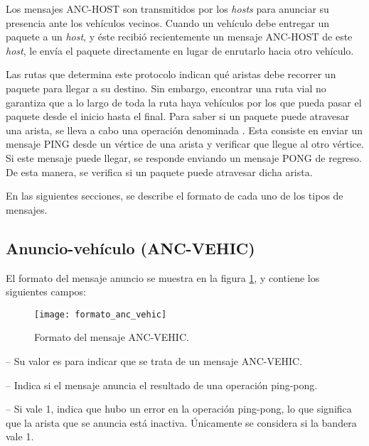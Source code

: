Los mensajes ANC-HOST son transmitidos por los \textit{hosts} para anunciar su
presencia ante los vehículos vecinos. Cuando un vehículo debe entregar un
paquete a un \textit{host}, y éste recibió recientemente un mensaje ANC-HOST de
este \textit{host}, le envía el paquete directamente en lugar de enrutarlo
hacia otro vehículo.

Las rutas que determina este protocolo indican qué aristas debe recorrer un
paquete para llegar a su destino. Sin embargo, encontrar una ruta vial no
garantiza que a lo largo de toda la ruta haya vehículos por los que pueda pasar
el paquete desde el inicio hasta el final. Para saber si un paquete puede
atravesar una arista, se lleva a cabo una operación denominada
. Esta consiste en enviar un mensaje PING desde un vértice
de una arista y verificar que llegue al otro vértice. Si este mensaje puede
llegar, se responde enviando un mensaje PONG de regreso. De esta manera, se
verifica si un paquete puede atravesar dicha arista.

En las siguientes secciones, se describe el formato de cada uno de los tipos de
mensajes.

\subsection{Anuncio-vehículo (ANC-VEHIC)}

\label{subsec:mensaje_anc_vehic}

El formato del mensaje anuncio se muestra en la figura
\ref{fig:formato_anc_vehic}, y contiene los siguientes campos:

\begin{figure}[th!]
\centering
\texttt{[image: formato\_anc\_vehic]}
\decoRule
\caption[Formato del mensaje ANC-VEHIC]{Formato del mensaje ANC-VEHIC.}
\label{fig:formato_anc_vehic}
\end{figure}

 -- Su valor es  para indicar que se trata de un
mensaje ANC-VEHIC.

 -- Indica si el mensaje anuncia el resultado de una
operación ping-pong.

 -- Si vale 1, indica que hubo un error en la operación
ping-pong, lo que significa que la arista que se anuncia está inactiva.
Únicamente se considera si la bandera  vale 1.

